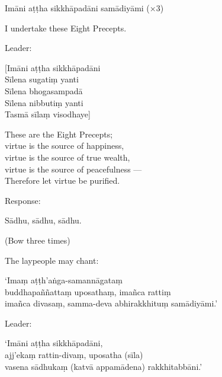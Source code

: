 Imāni aṭṭha sikkhāpadāni samādiyāmi (×3)

\begin{english}
  I undertake these Eight Precepts.
\end{english}

\begin{instruction}
  Leader:
\end{instruction}

[Imāni aṭṭha sikkhāpadāni\\
Sīlena sugatiṃ yanti\\
Sīlena bhogasampadā\\
Sīlena nibbutiṃ yanti\\
Tasmā sīlaṃ visodhaye]

\begin{english}
  These are the Eight Precepts;\\
  virtue is the source of happiness,\\
  virtue is the source of true wealth,\\
  virtue is the source of peacefulness ---\\
  Therefore let virtue be purified.
\end{english}

\begin{instruction}
  Response:
\end{instruction}

Sādhu, sādhu, sādhu.

\begin{instruction}
  (Bow three times)
\end{instruction}


\begin{instruction}
  The laypeople may chant:
\end{instruction}

‘Imaṃ aṭṭh'aṅga-samannāgataṃ\\
buddhapaññattaṃ uposathaṃ, imañca rattiṃ\\
imañca divasaṃ, samma-deva abhirakkhituṃ samādiyāmi.’

\begin{instruction}
  Leader:
\end{instruction}

‘Imāni aṭṭha sikkhāpadāni,\\
ajj'ekaṃ rattin-divaṃ, uposatha (sīla)\\
vasena sādhukaṃ (katvā appamādena) rakkhitabbāni.’

